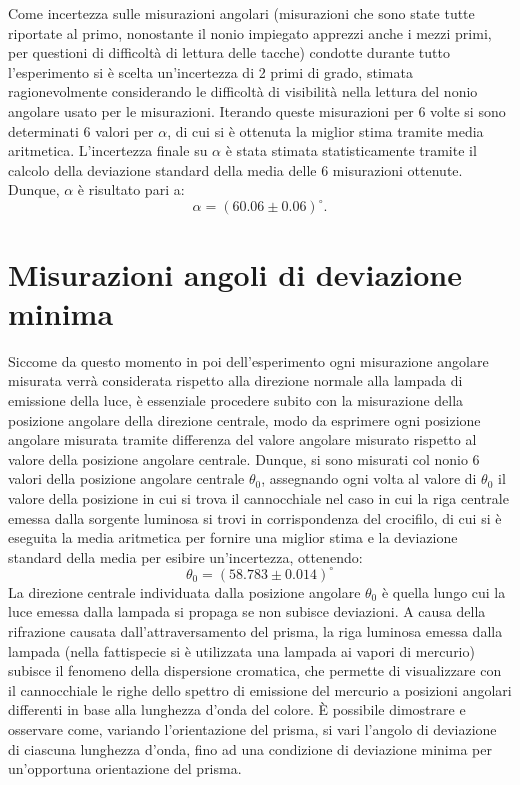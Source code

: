 \documentclass[a4paper,12pt]{article}
\begin{document}
Come incertezza sulle misurazioni angolari (misurazioni che sono state tutte riportate al primo, nonostante il nonio impiegato apprezzi anche i mezzi primi, per questioni di difficoltà di lettura delle tacche) condotte durante tutto l’esperimento si è scelta un’incertezza di 2 primi di grado, stimata ragionevolmente considerando le difficoltà di visibilità nella lettura del nonio angolare usato per le misurazioni. 
Iterando queste misurazioni per 6 volte si sono determinati 6 valori per \( \alpha \), di cui si è ottenuta la miglior stima tramite media aritmetica. L’incertezza finale su \( \alpha \) è stata stimata statisticamente tramite il calcolo della deviazione standard della media delle 6 misurazioni ottenute.
Dunque, \( \alpha \) è risultato pari a:
\[\alpha = (60.06 \pm 0.06)^\circ.\] 

\section{Misurazioni angoli di deviazione minima}
Siccome da questo momento in poi dell’esperimento ogni misurazione angolare misurata verrà considerata rispetto alla direzione normale alla lampada di emissione della luce, è essenziale procedere subito con la misurazione della posizione angolare della direzione centrale, modo da esprimere ogni posizione angolare misurata tramite differenza del valore angolare misurato rispetto al valore della posizione angolare centrale.
Dunque, si sono misurati col nonio 6 valori della posizione angolare centrale \( \theta_0 \), assegnando ogni volta al valore di \( \theta_0 \) il valore della posizione in cui si trova il cannocchiale nel caso in cui la riga centrale emessa dalla sorgente luminosa si trovi in corrispondenza del crocifilo, di cui si è eseguita la media aritmetica per fornire una miglior stima e la deviazione standard della media per esibire un’incertezza, ottenendo:
\[
\theta_0 = (58.783 \pm 0.014)^\circ
\]
La direzione centrale individuata dalla posizione angolare \( \theta_0 \) è quella lungo cui la luce emessa dalla lampada si propaga se non subisce deviazioni.
A causa della rifrazione causata dall’attraversamento del prisma, la riga luminosa emessa dalla lampada (nella fattispecie si è utilizzata una lampada ai vapori di mercurio) subisce il fenomeno della dispersione cromatica, che permette di visualizzare con il cannocchiale le righe dello spettro di emissione del mercurio a posizioni angolari differenti in base alla lunghezza d’onda del colore.
È possibile dimostrare e osservare come, variando l’orientazione del prisma, si vari l’angolo di deviazione di ciascuna lunghezza d’onda, fino ad una condizione di deviazione minima per un’opportuna orientazione del prisma.
\end{document}
